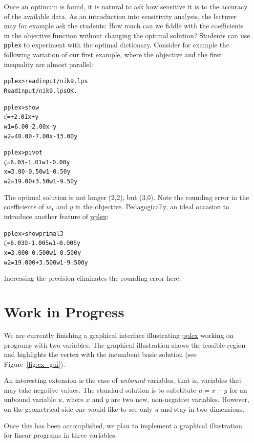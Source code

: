 \documentclass[ukenglish]{nik}
\begin{document}
Once an optimum is found, it is natural to ask how sensitive it is to the accuracy of the available data. 
As an introduction into sensitivity analysis, the lecturer may for example ask the students: 
How much can we fiddle with the coefficients in the objective function without changing the optimal solution?
Students can use \texttt{pplex} to experiment with the optimal dictionary.
Consider for example the following variation of our first example,
where the objective and the first inequality are almost parallel:
\begin{alltt}
pplex> read input/nik9.lps
Read input/nik9.lps OK.

pplex> show        
 \(\zeta\) =       + 2.01x +      y
w1 =  6.00 - 2.00x -      y
w2 = 40.00 - 7.00x - 13.00y

pplex> pivot
 \(\zeta\) =  6.03 - 1.01w1 - 0.00y
 x =  3.00 - 0.50w1 - 0.50y
w2 = 19.00 + 3.50w1 - 9.50y
\end{alltt}
The optimal solution is not longer (2,2), but (3,0). 
Note the rounding error in the coefficients of $w_1$ and $y$ in the objective.
Pedagogically, an ideal occasion to introduce another feature of \url{pplex}: 
\begin{alltt}
pplex> show primal 3
 \(\zeta\) =  6.030 - 1.005w1 - 0.005y
 x =  3.000 - 0.500w1 - 0.500y
w2 = 19.000 + 3.500w1 - 9.500y
\end{alltt}
Increasing the precision eliminates the rounding error here.

\section{Work in Progress}\label{sec:future}
 
We are currently finishing a graphical interface illustrating \url{pplex} working on programs with two variables. 
The graphical illustration shows the feasible
region and highlights the vertex with the incumbent basic solution (see Figure~\ref{fig:ex_gui}).

An interesting extension is the case of \emph{unbound} variables, that is, variables that may take
negative values. The standard solution is to substitute $u = x-y$ for an unbound variable $u$,
where $x$ and $y$ are two new, non-negative variables. However, on the geometrical side one would
like to see only $u$ and stay in two dimensions.

Once this has been accomplished, we plan to implement a graphical
illustration for linear programs in three variables.
\end{document}
